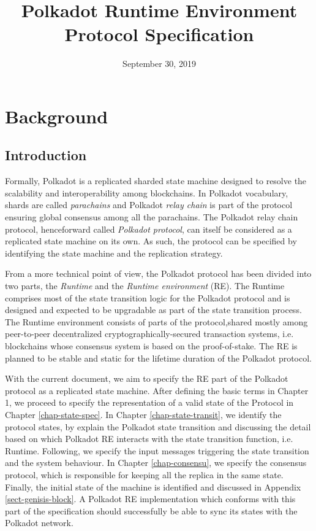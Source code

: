 \documentclass{book}
\newcommand{\tmem}[1]{{\em #1\/}}
\newcommand{\tmtextit}[1]{{\itshape{#1}}}
\providecommand{\tmem}[1]{\tmtextit{#1}}
\providecommand{\tmtextit}[1]{\tmtextit{#1}}
\begin{document}
\title{
  Polkadot Runtime Environment\\
  {\Large Protocol Specification}
}

\date{September 30, 2019}

\maketitle

{\tableofcontents}

\chapter{Background}

\section{Introduction}

Formally, Polkadot is a replicated sharded state machine designed to resolve
the scalability and interoperability among blockchains. In Polkadot
vocabulary, shards are called {\tmem{parachains}} and Polkadot {\tmem{relay
chain}} is part of the protocol ensuring global consensus among all the
parachains. The Polkadot relay chain protocol, henceforward called
{\tmem{Polkadot protocol}}, can itself be considered as a replicated state
machine on its own. As such, the protocol can be specified by identifying the
state machine and the replication strategy.

From a more technical point of view, the Polkadot protocol has been divided
into two parts, the {\tmem{Runtime}} and the {\tmem{Runtime environment}}
(RE). The Runtime comprises most of the state transition logic for the
Polkadot protocol and is designed and expected to be upgradable as part of the
state transition process. The Runtime environment consists of parts of the
protocol,\quad shared mostly among peer-to-peer decentralized
cryptographically-secured transaction systems, i.e. blockchains whose
consensus system is based on the proof-of-stake. The RE is planned to be
stable and static for the lifetime duration of the Polkadot protocol.

With the current document, we aim to specify the RE part of the Polkadot
protocol as a replicated state machine. After defining the basic terms in
Chapter 1, we proceed to specify the representation of a valid state of the
Protocol in Chapter \ref{chap-state-spec}. In Chapter
\ref{chap-state-transit}, we identify the protocol states, by explain the
Polkadot state transition and discussing the detail based on which Polkadot RE
interacts with the state transition function, i.e. Runtime. Following, we
specify the input messages triggering the state transition and the system
behaviour. In Chapter \ref{chap-consensu}, we specify the consensus protocol,
which is responsible for keeping all the replica in the same state. Finally,
the initial state of the machine is identified and discussed in Appendix
\ref{sect-genisis-block}. A Polkadot RE implementation which conforms with
this part of the specification should successfully be able to sync its states
with the Polkadot network.
\end{document}
